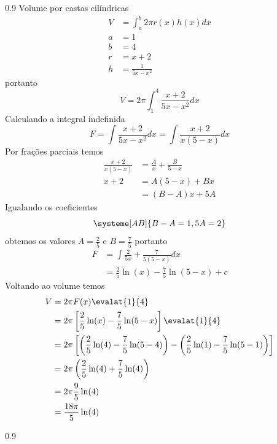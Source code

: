 \documentclass[a4paper,12pt,fleqn]{article}
\newenvironment{resposta}%
{\begingroup\color{blue}\small\begin{spacing}{0.9}}%
  {\end{spacing}\endgroup}
\begin{document}
\begin{resposta}
  Volume por castas cilíndricas
  \begin{align*}
    V & = \int_a^b 2\pi r(x) h(x) dx \\
    a & = 1 \\
    b & = 4 \\
    r & = x+2 \\
    h & = \frac{1}{5x-x^2}
  \end{align*}
  portanto
  \[
    V = 2\pi \int_1^4 \frac{x+2}{5x-x^2} dx
  \]
  Calculando a integral indefinida
  \[
    F = \int \frac{x+2}{5x-x^2} dx = \int \frac{x+2}{x(5-x)} dx
  \]
  Por frações parciais temos
  \begin{align*}
    \frac{x+2}{x(5-x)} & = \frac{A}{x} + \frac{B}{5-x} \\
    x+2                & = A(5-x) + Bx                 \\
    & = (B-A)x + 5A
  \end{align*}
  Igualando os coeficientes
  \[
    \systeme[AB]{B-A=1,5A=2}
  \]
  obtemos os valores
  \(A=\frac{2}{5}\) e
  \(B=\frac{7}{5}\)
  portanto
  \begin{align*}
    F & = \int \frac{2}{5x} + \frac{7}{5(5-x)} dx \\
      & = \frac{2}{5}\ln(x) - \frac{7}{5}\ln(5-x) + c
  \end{align*}
  Voltando ao volume temos
  \begin{align*}
    V
    & = 2\pi F(x)\evalat{1}{4} \\
    & = 2\pi \left[\frac{2}{5}\ln(x) - \frac{7}{5}\ln(5-x)\right] \evalat{1}{4} \\
    & = 2\pi \left[
      \left(\frac{2}{5}\ln(4) - \frac{7}{5}\ln(5-4)\right)
    - \left(\frac{2}{5}\ln(1) - \frac{7}{5}\ln(5-1)\right)
    \right] \\
    & = 2\pi \left(\frac{2}{5}\ln(4) + \frac{7}{5}\ln(4)\right) \\
    & = 2\pi \frac{9}{5}\ln(4) \\
    & = \frac{18\pi}{5} \ln(4)
  \end{align*}
\end{resposta}



\begin{resposta}
\end{resposta}

\end{document}
